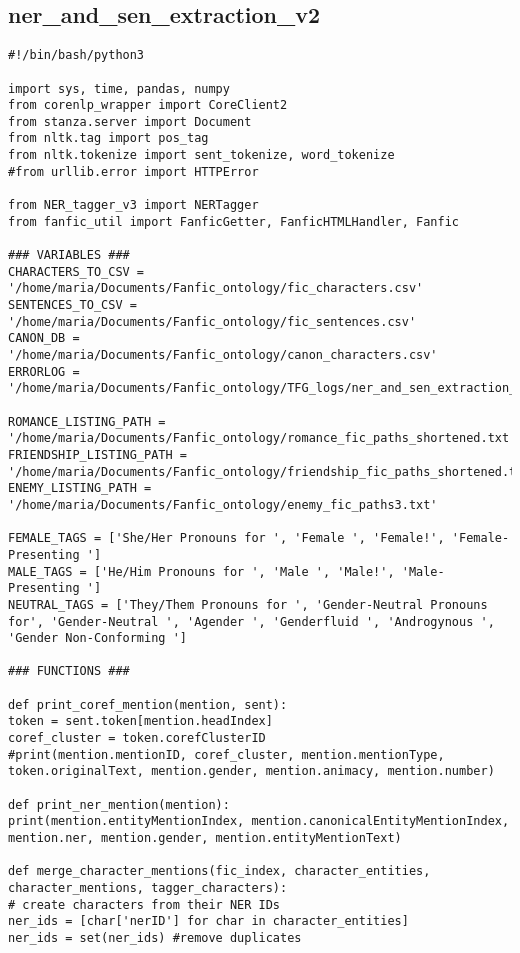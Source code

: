 \documentclass{pre-tfg}
\begin{document}
\subsection{ner\_and\_sen\_extraction\_v2}
\begin{lstlisting}[style=consola]
#!/bin/bash/python3

import sys, time, pandas, numpy
from corenlp_wrapper import CoreClient2
from stanza.server import Document
from nltk.tag import pos_tag
from nltk.tokenize import sent_tokenize, word_tokenize
#from urllib.error import HTTPError

from NER_tagger_v3 import NERTagger
from fanfic_util import FanficGetter, FanficHTMLHandler, Fanfic

### VARIABLES ###
CHARACTERS_TO_CSV = '/home/maria/Documents/Fanfic_ontology/fic_characters.csv'
SENTENCES_TO_CSV = '/home/maria/Documents/Fanfic_ontology/fic_sentences.csv'
CANON_DB = '/home/maria/Documents/Fanfic_ontology/canon_characters.csv'
ERRORLOG = '/home/maria/Documents/Fanfic_ontology/TFG_logs/ner_and_sen_extraction_v2_errorlog.txt'

ROMANCE_LISTING_PATH = '/home/maria/Documents/Fanfic_ontology/romance_fic_paths_shortened.txt'
FRIENDSHIP_LISTING_PATH = '/home/maria/Documents/Fanfic_ontology/friendship_fic_paths_shortened.txt'
ENEMY_LISTING_PATH = '/home/maria/Documents/Fanfic_ontology/enemy_fic_paths3.txt'

FEMALE_TAGS = ['She/Her Pronouns for ', 'Female ', 'Female!', 'Female-Presenting ']
MALE_TAGS = ['He/Him Pronouns for ', 'Male ', 'Male!', 'Male-Presenting ']
NEUTRAL_TAGS = ['They/Them Pronouns for ', 'Gender-Neutral Pronouns for', 'Gender-Neutral ', 'Agender ', 'Genderfluid ', 'Androgynous ', 'Gender Non-Conforming ']

### FUNCTIONS ###

def print_coref_mention(mention, sent):
token = sent.token[mention.headIndex]
coref_cluster = token.corefClusterID
#print(mention.mentionID, coref_cluster, mention.mentionType, token.originalText, mention.gender, mention.animacy, mention.number)

def print_ner_mention(mention):	
print(mention.entityMentionIndex, mention.canonicalEntityMentionIndex, mention.ner, mention.gender, mention.entityMentionText)

def merge_character_mentions(fic_index, character_entities, character_mentions, tagger_characters):
# create characters from their NER IDs
ner_ids = [char['nerID'] for char in character_entities]
ner_ids = set(ner_ids) #remove duplicates


\end{lstlisting}
\end{document}
